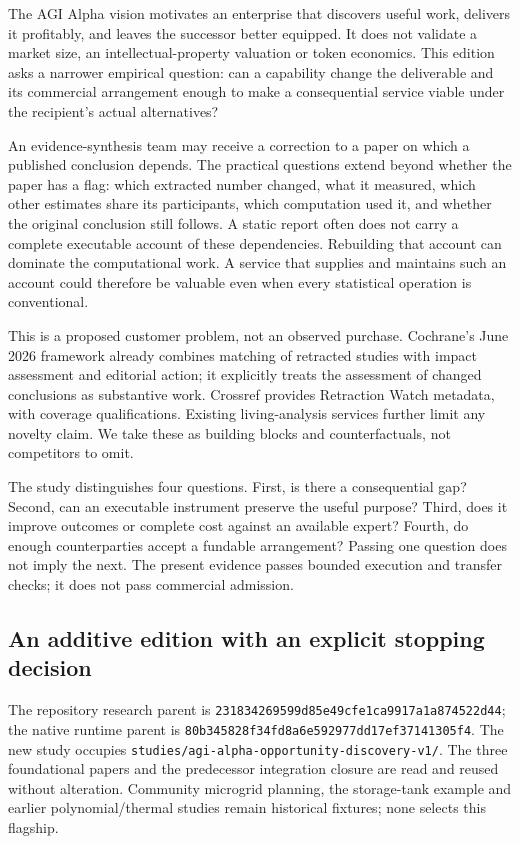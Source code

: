 The AGI Alpha vision motivates an enterprise that discovers useful work, delivers it profitably, and leaves the successor better equipped. It does not validate a market size, an intellectual-property valuation or token economics. This edition asks a narrower empirical question: can a capability change the deliverable and its commercial arrangement enough to make a consequential service viable under the recipient's actual alternatives?

An evidence-synthesis team may receive a correction to a paper on which a published conclusion depends. The practical questions extend beyond whether the paper has a flag: which extracted number changed, what it measured, which other estimates share its participants, which computation used it, and whether the original conclusion still follows. A static report often does not carry a complete executable account of these dependencies. Rebuilding that account can dominate the computational work. A service that supplies and maintains such an account could therefore be valuable even when every statistical operation is conventional.

This is a proposed customer problem, not an observed purchase. Cochrane's June 2026 framework already combines matching of retracted studies with impact assessment and editorial action; it explicitly treats the assessment of changed conclusions as substantive work. Crossref provides Retraction Watch metadata, with coverage qualifications. Existing living-analysis services further limit any novelty claim. We take these as building blocks and counterfactuals, not competitors to omit.\citep{cochrane,crossref,dynameta}

The study distinguishes four questions. First, is there a consequential gap? Second, can an executable instrument preserve the useful purpose? Third, does it improve outcomes or complete cost against an available expert? Fourth, do enough counterparties accept a fundable arrangement? Passing one question does not imply the next. The present evidence passes bounded execution and transfer checks; it does not pass commercial admission.

\subsection{An additive edition with an explicit stopping decision}

The repository research parent is \nolinkurl{231834269599d85e49cfe1ca9917a1a874522d44}; the native runtime parent is \nolinkurl{80b345828f34fd8a6e592977dd17ef37141305f4}. The new study occupies \texttt{studies/agi-alpha-opportunity-discovery-v1/}. The three foundational papers and the predecessor integration closure are read and reused without alteration. Community microgrid planning, the storage-tank example and earlier polynomial/thermal studies remain historical fixtures; none selects this flagship.\citep{repository,ti,economy,harness}

